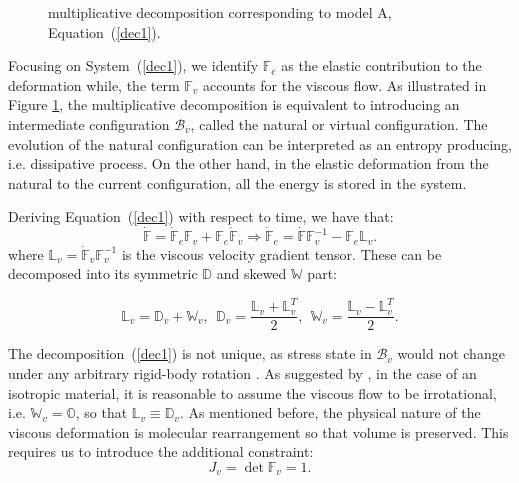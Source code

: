 \documentclass[runningheads]{llncs}
\newcommand{\F}{\ensuremath{\mathbb{F}}}
\newcommand{\LL}{\ensuremath{\mathbb{L}}}
\begin{document}
%	
%	

\begin{figure}[h!]
	\centering
	\hspace{20mm}
	\Large
	\def\svgwidth{0.6\linewidth}
	\caption{multiplicative decomposition corresponding to model A, Equation~(\ref{dec1}).}
\label{Model2}
\end{figure}

Focusing on System~(\ref{dec1}), we identify $\F_e$ as the elastic contribution to the deformation while, the term $\F_v$ accounts for the viscous flow. As illustrated in Figure \ref{Model2}, the multiplicative decomposition is equivalent to introducing an intermediate configuration $\mathcal{B}_v$, called the natural or virtual configuration. The evolution of the natural configuration can be interpreted as an entropy producing, i.e. dissipative process. On the other hand, in the elastic deformation from the natural to the current configuration, all the energy is stored in the system. 

Deriving Equation~(\ref{dec1}) with respect to time, we have that:
\begin{equation}
\dot{\F}=\dot{\F}_e\F_v+\F_e\dot{\F}_v \Longrightarrow \dot{\F}_e=\dot{\F}\F_v^{-1}-\F_e \LL_v. \label{lv}
\end{equation}
where $\LL_v=\dot{\F}_v\F_v^{-1}$ is the viscous velocity gradient tensor. These can be decomposed into its symmetric $\mathbb{D}$ and skewed $\mathbb{W}$ part:

\begin{equation}
\LL_v = \mathbb{D}_v + \mathbb{W}_v,  \ \ \mathbb{D}_v = \frac{\LL_v+\LL^T_v}{2}, \ \ \mathbb{W}_v = \frac{\LL_v-\LL^T_v}{2}.
\end{equation}

The decomposition~(\ref{dec1}) is not unique, as stress state in $\mathcal{B}_v$ would not change under any arbitrary rigid-body rotation \cite{multdec}. As suggested by \cite{Plasto}, in the case of an isotropic material, it is reasonable to assume the viscous flow to be irrotational, i.e. $\mathbb{W}_v=\mathbb{O}$, so that $\LL_v \equiv \mathbb{D}_v$.
As mentioned before, the physical nature of the viscous deformation is molecular rearrangement so that volume is preserved. This requires us to introduce the additional constraint:
\begin{equation}
J_v=\det \F_v= 1.\label{Jv}
\end{equation}
\end{document}
